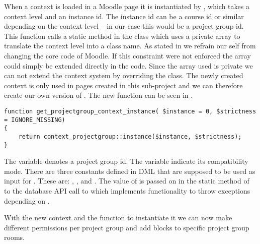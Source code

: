 When a context is loaded in a Moodle page it is instantiated by , which takes a context level and an instance id. 
The instance id can be a course id or similar depending on the context level -- in our case this would be a project group id. 
This function calls a static method in the  class which uses a private array to translate the context level into a class name.
As stated in  we refrain our self from changing the core code of Moodle. 
If this constraint were not enforced the array could simply be extended directly in the code.  
Since the array used is private we can not extend the context system by overriding the  class. 
The newly created context is only used in pages created in this sub-project and we can therefore create our own version of . 
The new function can be seen in .
\begin{lstlisting}[style=phpCode, caption=\myCaption{The function to get projectgroup context}, label=src:codeprojectgroupcontextinstance]
function get_projectgroup_context_instance( $instance = 0, $strictness = IGNORE_MISSING) 
{ 
    return context_projectgroup::instance($instance, $strictness);
}
\end{lstlisting}

The  variable denotes a project group id.
The  variable indicate its compatibility mode.
There are three constants defined in \moodle{} DML that are supposed to be used as input for .
These are: , , and .
The value of  is passed on in the static method  of  to the \moodle{} database API call to  which implements functionality to throw exceptions depending on .

With the new context and the function to instantiate it we can now make different permissions per project group and add blocks to specific project group rooms. 